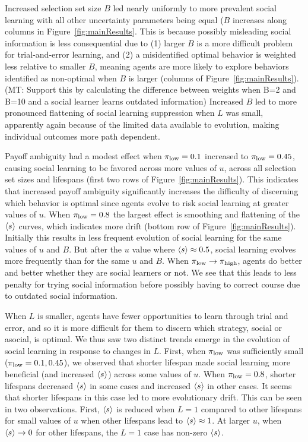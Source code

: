 \documentclass[letterpaper,11.5pt]{scrartcl}
\newcommand{\mt}[1]{{\textcolor{myorange} {({\tiny MT:} #1)}}}
\begin{document}
Increased selection set size $B$ led nearly uniformly to more prevalent social
learning with all other uncertainty parameters being equal ($B$ increases along
columns in Figure~\ref{fig:mainResults}. 
This is because possibly misleading 
social information is less consequential due
to (1) larger $B$ is a more difficult problem for trial-and-error learning, and
(2) a misidentified optimal behavior is weighted less relative to smaller
$B$, meaning agents are more likely to explore behaviors identified as non-optimal
when $B$ is larger (columns of Figure~\ref{fig:mainResults}).  \mt{Support this by calculating the difference between weights when B=2 and B=10 and a social learner learns outdated information}
Increased $B$ led to more pronounced flattening of social learning suppression when
$L$ was small, apparently again because of the limited data available to evolution,
making individual outcomes more path dependent.

Payoff ambiguity had a modest effect when $\pi_{\mathrm{low}} = 0.1$ increased to $\pi_{\mathrm{low}} = 0.45$,
causing social learning to be favored across more values of $u$, across all
selection set sizes and lifespans (first two rows of Figure~\ref{fig:mainResults}). 
This indicates that increased payoff ambiguity significantly increases the 
difficulty of discerning which behavior is optimal since agents evolve to 
risk social learning at greater values of $u$.
When $\pi_{\mathrm{low}} = 0.8$ the largest effect is smoothing and flattening of the $\langle s \rangle$ curves,
which indicates more drift (bottom row of Figure~\ref{fig:mainResults}). 
Initially this results in less frequent evolution
of social learning for the same values of $u$ and $B$. But after 
the $u$ value where $\langle s \rangle \approx 0.5$, social learning evolves more frequently than
for the same $u$ and $B$. When $\pi_{\mathrm{low}} \to \pi_{\mathrm{high}}$, agents do better and better
whether they are social learners or not. We see that this leads to less penalty
for trying social information before possibly having to correct course due to
outdated social information.

When $L$ is smaller, agents have fewer opportunities
to learn through trial and error, and so it is more difficult for them to discern
which strategy, social or asocial, is optimal. We thus saw two distinct 
trends emerge in the evolution of social learning in response to changes in $L$.
First, when $\pi_{\mathrm{low}}$ was sufficiently small ($\pi_{\mathrm{low}}=0.1, 0.45$), we observed that shorter
lifespan made social learning more beneficial (and increased $\langle s \rangle$) 
across some values of $u$. When $\pi_{\mathrm{low}}=0.8$, shorter lifespans decreased 
$\langle s \rangle$ in some cases and increased $\langle s \rangle$ in other cases. It seems
that shorter lifespans in this case led to more evolutionary drift. This can
be seen in two observations. First,
$\langle s \rangle$ is reduced when $L=1$ compared to other lifespans for small values of
$u$ when other lifespans lead to $\langle s \rangle \approx 1$. At larger $u$, when
$\langle s \rangle \to 0$ for other lifespans, the $L=1$ case has non-zero $\langle s \rangle$.
\end{document}

